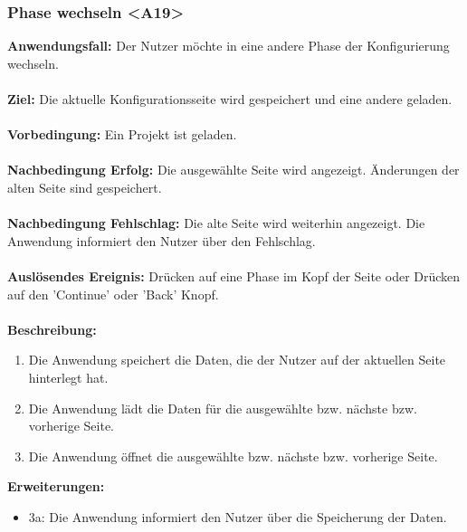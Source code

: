 \documentclass[parskip=full]{scrartcl} %
\begin{document}
\subsubsection*{Phase wechseln <A19>}
\textbf{Anwendungsfall:} Der Nutzer möchte in eine andere Phase der Konfigurierung wechseln.\\\\
\textbf{Ziel:} Die aktuelle Konfigurationsseite wird gespeichert und eine andere geladen. \\\\
\textbf{Vorbedingung:} Ein Projekt ist geladen. \\\\
\textbf{Nachbedingung Erfolg:} Die ausgewählte Seite wird angezeigt. Änderungen der alten Seite sind gespeichert.\\\\
\textbf{Nachbedingung Fehlschlag:} Die alte Seite wird weiterhin angezeigt. Die Anwendung informiert den Nutzer über den Fehlschlag. \\\\
\textbf{Auslösendes Ereignis:} Drücken auf eine Phase im Kopf der Seite oder Drücken auf den 'Continue' oder 'Back' Knopf. \\\\
\textbf{Beschreibung:}
\begin{enumerate}
    \item Die Anwendung speichert die Daten, die der Nutzer auf der aktuellen Seite hinterlegt hat.
    \item Die Anwendung lädt die Daten für die ausgewählte bzw. nächste bzw. vorherige Seite.
    \item Die Anwendung öffnet die ausgewählte bzw. nächste bzw. vorherige Seite.
\end{enumerate}
\textbf{Erweiterungen:} 
\begin{itemize}
    \item 3a: Die Anwendung informiert den Nutzer über die Speicherung der Daten.
\end{itemize}
\newpage
\end{document}
